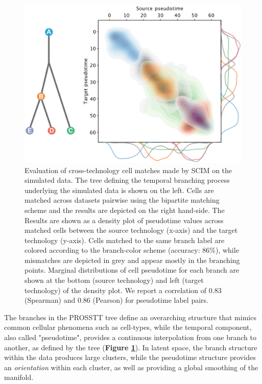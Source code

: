 \begin{figure}[htp]
    \centering
    \includegraphics[width=\textwidth]{figures/integration/pseudotime-kde-tree-inverted_thick.png}
    \caption{
    Evaluation of cross-technology cell matches made by SCIM on the simulated data. The tree defining the temporal branching process underlying the simulated data is shown on the left. Cells are matched across datasets pairwise using the bipartite matching scheme and the results are depicted on the right hand-side. The Results are shown as a density plot of pseudotime values across matched cells between the source technology (x-axis) and the target technology (y-axis). Cells matched to the same branch label are colored according to the branch-color scheme (accuracy: 86\%), while mismatches are depicted in grey and appear mostly in the branching points. Marginal distributions of cell pseudotime for each branch are shown at the bottom (source technology) and left (target technology) of the density plot. We report a correlation of 0.83 (Spearman) and 0.86 (Pearson) for pseudotime label pairs.
    }
    \label{fig:prosstt5-pseudotime-inverted}
\end{figure}


The branches in the PROSSTT tree define an overarching structure that mimics common cellular phenomena such as cell-types, while the temporal component, also called "pseudotime", provides a continuous interpolation from one branch to another, as defined by the tree  (\textbf{Figure \ref{fig:prosstt5-pseudotime-inverted}}).
In latent space, the branch structure within the data produces large clusters, while the pseudotime structure provides an \textit{orientation} within each cluster, as well as providing a global smoothing of the manifold.

